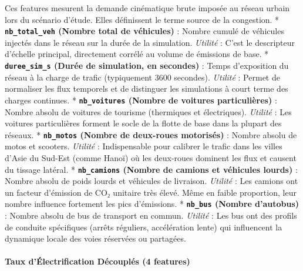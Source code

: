 \documentclass[11pt, a4paper]{article}
\begin{document}
Ces features mesurent la demande cinématique brute imposée au réseau
urbain lors du scénario d'étude. Elles définissent le terme source de la
congestion. * \textbf{\texttt{nb\_total\_veh} (Nombre total de
véhicules)} : Nombre cumulé de véhicules injectés dans le réseau sur la
durée de la simulation. \emph{Utilité} : C'est le descripteur d'échelle
principal, directement corrélé au volume de émissions de base. *
\textbf{\texttt{duree\_sim\_s} (Durée de simulation, en secondes)} :
Temps d'exposition du réseau à la charge de trafic (typiquement 3600
secondes). \emph{Utilité} : Permet de normaliser les flux temporels et
de distinguer les simulations à court terme des charges continues. *
\textbf{\texttt{nb\_voitures} (Nombre de voitures particulières)} :
Nombre absolu de voitures de tourisme (thermiques et électriques).
\emph{Utilité} : Les voitures particulières forment le socle de la
flotte de base dans la plupart des réseaux. * \textbf{\texttt{nb\_motos}
(Nombre de deux-roues motorisés)} : Nombre absolu de motos et scooters.
\emph{Utilité} : Indispensable pour calibrer le trafic dans les villes
d'Asie du Sud-Est (comme Hanoï) où les deux-roues dominent les flux et
causent du tissage latéral. * \textbf{\texttt{nb\_camions} (Nombre de
camions et véhicules lourds)} : Nombre absolu de poids lourds et
véhicules de livraison. \emph{Utilité} : Les camions ont un facteur
d'émission de CO₂ unitaire très élevé. Même en faible proportion, leur
nombre influence fortement les pics d'émissions. *
\textbf{\texttt{nb\_bus} (Nombre d'autobus)} : Nombre absolu de bus de
transport en commun. \emph{Utilité} : Les bus ont des profils de
conduite spécifiques (arrêts réguliers, accélération lente) qui
influencent la dynamique locale des voies réservées ou partagées.

\paragraph{Taux d'Électrification Découplés (4
features)}\label{taux-duxe9lectrification-duxe9coupluxe9s-4-features}
\end{document}
